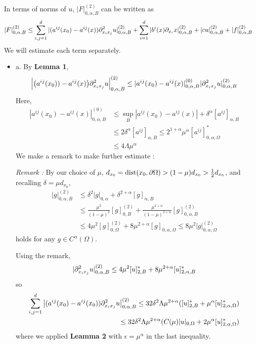 \documentclass[12pt,a4paper]{article}
\newenvironment{proof}
{\begin{changemargin}{1cm}{0.5cm} 
	}%
	{\end{changemargin}
}
\renewenvironment{i}
{\begin{itemize} 
	}%
	{\end{itemize}
}
\newenvironment{p}
{\begin{proof} 
	}%
	{\end{proof}
}
\begin{document}
\begin{p}
In terms of norms of $u$, $|F|^{(2)}_{0, \alpha, B}$ can be written as
\begin{align*}
|F|^{(2)}_{0, \alpha, B} \leq \sum_{i,j=1}^d |(a^{ij}(x_0) - a^{ij}(x)) \partial^2_{x_i x_j} u|^{(2)}_{0, \alpha, B} + \sum_{i=1}^d |b^i(x) \partial_{x_i} x |^{(2)}_{0, \alpha, B} + |cu|^{(2)}_{0, \alpha, B} + |f|^{(2)}_{0, \alpha, B}
\end{align*}
We will estimate each term separately.

\begin{i} 
\item[a.] By \textbf{Lemma 1},
\begin{align*}
\Big|\big(a^{ij}(x_0)) - a^{ij}(x)\big)\partial^2_{x_i x_j}u \Big|^{(2)}_{0, \alpha, B} \leq |a^{ij}(x_0)- a^{ij}(x)|^{(0)}_{0, \alpha, B} |\partial^2_{x_i x_j} u|^{(2)}_{0, \alpha, B} 
\end{align*}
Here,
\begin{align*}
|a^{ij}(x_0) - a^{ij}(x)|^{(0)}_{0, \alpha, B} &\leq \sup_B |a^{ij}(x_0)-a^{ij}(x)| + {\delta}^{\alpha}[a^{ij}]_{\alpha, B} \\
& \leq 2\delta^{\alpha} [a^{ij}]_{\alpha, B} \leq 2^{1+\alpha} \mu^{\alpha} [a^{ij}]^{*}_{0, \alpha, \Omega} \\
& \leq 4\Lambda \mu^{\alpha}
\end{align*}
We make a remark to make further estimate :

\emph{Remark :} By our choice of $\mu$, $d_{x_0} = \text{dist}(x_0, \partial \Omega) > (1- \mu) d_{x_0} > \frac{1}{2} d_{x_0}$, and recalling $\delta = \mu d_{x_0}$, 
\begin{align*}
|g|^{(2)}_{0, \alpha, B} &\leq \delta^2 |g|_{0, \alpha} + \delta^{2+ \alpha} [g]_{\alpha, B} \\
&\leq \frac{\mu^2}{(1-\mu)^2} [g]^{(2)}_{0, B} + \frac{\mu^{2+ \alpha}}{(1- \mu)^{2+\alpha}} [g]^{(2)}_{0, \alpha, B} \\
&\leq 4\mu^2 [g]^{(2)}_{0, \Omega} + 8\mu^{2+\alpha}[g]_{0, \alpha,\Omega} \leq 8\mu^2 |g|^{(2)}_{0, \alpha, \Omega}
\end{align*}
holds for any $g\in C^{\alpha}(\Omega)$.

\quad Using the remark,
\begin{align*}
|\partial^2_{x_i x_j} u|^{(2)}_{0, \alpha, B} \leq 4\mu^2 [u]^*_{2, B} + 8\mu^{2+\alpha} [u]^*_{2, \alpha, B}
\end{align*}
so
\begin{align*}
\sum_{i,j=1}^d \big| (a^{ij}(x_0) - a^{ij}(x_0)) \partial^2_{x_i x_j}u \big|^{(2)}_{0, \alpha, B} \leq 32\delta^2 \Lambda \mu^{2+ \alpha} ([u]^*_{2, B} + \mu^{\alpha} [u]^*_{2, \alpha, \Omega}) \\
\leq 32\delta^2 \Lambda \mu^{2+\alpha} (C(\mu)|u|_{0, \Omega} + 2\mu^{\alpha}[u]^*_{2, \alpha, \Omega})
\end{align*}
where we applied \textbf{Leamma 2} with $\epsilon = \mu^{\alpha}$ in the last inequality.


\end{i}
\end{p}
\end{document}
